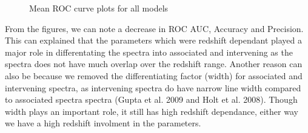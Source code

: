 \documentclass{article}
\begin{document}
\begin{figure}[h]
    \qquad
    \caption{Mean ROC curve plots for all models}%
    \label{fig:2}%
\end{figure}

From the figures, we can note a decrease in ROC AUC, Accuracy and Precision. This can explained that the parameters which were redshift dependant played a major role in differentating the spectra into associated and intervening as the spectra does not have much overlap over the redshift range. Another reason can also be because we removed the differentiating factor (width) for associated and intervening spectra, as intervening spectra do have narrow line width compared to associated spectra spectra (Gupta et al. 2009 and Holt et al. 2008). Though width plays an important role, it still has high redshift dependance, either way we have a high redshift involment in the parameters. 

\iffalse
\end{document}
